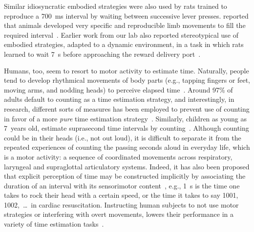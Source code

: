 Similar idiosyncratic embodied strategies were also used by rats trained to reproduce a 700~ms interval by waiting between successive lever presses.
 reported that animals developed very specific and reproducible limb movements to fill the required interval~\cite{Kawai2015}.
Earlier work from our lab also reported stereotypical use of embodied strategies, adapted to a dynamic environment, in a task in which rats learned to wait 7~s before approaching the reward delivery port~\cite{Rueda2015NN}.
\par
Humans, too, seem to resort to motor activity to estimate time.
Naturally, people tend to develop rhythmical movements of body parts (e.g., tapping fingers or feet, moving arms, and nodding heads) to perceive elapsed time~\cite{Merchant2016CurrOp}.
Around 97\% of adults default to counting as a time estimation strategy, and interestingly, in research, different sorts of measures has been employed to prevent use of counting in favor of a more \textit{pure} time estimation strategy~\cite{Rattat2012}.
Similarly, children as young as 7~years old, estimate suprasecond time intervals by counting~\cite{Wilkening1987, Rakitin1998}.
Although counting could be in their heads (i.e., not out loud), it is difficult to separate it from the repeated experiences of counting the passing seconds aloud in everyday life, which is a motor activity:
    a sequence of coordinated movements across respiratory, laryngeal and supraglottal articulatory systems.
Indeed, it has also been proposed that explicit perception of time may be constructed implicitly by associating the duration of an interval with its sensorimotor content~\cite{Coull2018}, e.g., 1~s is the time one takes to rock their head with a certain speed, or the time it takes to say 1001, 1002,~\ldots~in cardiac resuscitation.
Instructing human subjects to not use motor strategies or interfering with overt movements, lowers their performance in a variety of time estimation tasks~\cite{Morillon2017PNAS, Wiener2019eNeuro, Meegan2000, Rakitin1998, Fautrelle2015PlosOne, Monier2019DevSci}.


